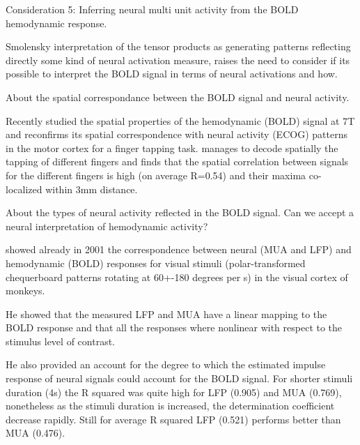  Consideration 5: Inferring neural multi unit activity from the BOLD hemodynamic response.

Smolensky interpretation of the tensor products as generating patterns reflecting directly some kind of neural activation measure, raises the need to consider if its possible to interpret the BOLD signal in terms of neural activations and how.

 About the spatial correspondance between the BOLD signal and neural activity.

Recently\citep{siero_bold_2014} studied the spatial properties of the hemodynamic (BOLD) signal at 7T and reconfirms its spatial correspondence with neural activity (ECOG) patterns in the motor cortex for a finger tapping task. \citep{siero_bold_2014} manages to decode spatially the tapping of different fingers and finds that the spatial correlation between signals for the different fingers is high (on average R=0.54) and their maxima co-localized within 3mm distance.



 About the types of neural activity reflected in the BOLD signal. Can we accept a neural interpretation of hemodynamic activity?

\citep{logothetis_neurophysiological_2001} showed already in 2001 the correspondence between neural (MUA and LFP) and hemodynamic (BOLD) responses for visual stimuli (polar-transformed chequerboard patterns rotating at 60+-180 degrees per s) in the visual cortex of monkeys.

He showed that the measured LFP and MUA have a linear mapping to the BOLD  response and that all the responses where nonlinear with respect to the  stimulus level of contrast.



He also provided an account for the degree to  which the estimated impulse response of neural signals could account for the  BOLD signal. For shorter stimuli duration (4s) the R squared was quite high for LFP  (0.905) and MUA (0.769), nonetheless as the stimuli duration is increased, the determination coefficient decrease rapidly. Still for average R squared LFP (0.521) performs better than MUA (0.476).

